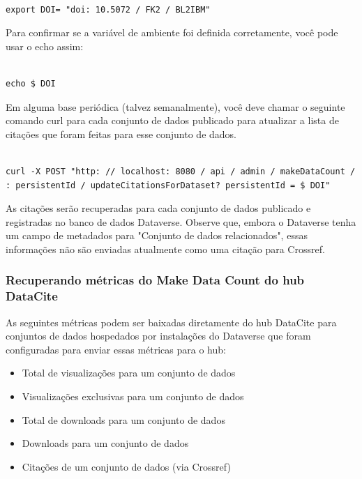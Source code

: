 \documentclass[12pt,hidelinks]{article}
\begin{document}
\begin{verbatim}

export DOI= "doi: 10.5072 / FK2 / BL2IBM"

\end{verbatim}

Para confirmar se a variável de ambiente foi definida corretamente, você pode usar o echo assim:

\begin{verbatim}

echo $ DOI

\end{verbatim}

Em alguma base periódica (talvez semanalmente), você deve chamar o seguinte comando curl para cada conjunto de dados publicado para atualizar a lista de citações que foram feitas para esse conjunto de dados.

\begin{verbatim}

curl -X POST "http: // localhost: 8080 / api / admin / makeDataCount /
: persistentId / updateCitationsForDataset? persistentId = $ DOI"

\end{verbatim}

As citações serão recuperadas para cada conjunto de dados publicado e registradas no banco de dados Dataverse. Observe que, embora o Dataverse tenha um campo de metadados para "Conjunto de dados relacionados", essas informações não são enviadas atualmente como uma citação para Crossref.

\subsubsection{Recuperando métricas do Make Data Count do hub DataCite}

\qquad As seguintes métricas podem ser baixadas diretamente do hub DataCite para conjuntos de dados hospedados por instalações do Dataverse que foram configuradas para enviar essas métricas para o hub:

\begin{itemize}

    \item Total de visualizações para um conjunto de dados
    \item Visualizações exclusivas para um conjunto de dados
    \item Total de downloads para um conjunto de dados
    \item Downloads para um conjunto de dados
    \item Citações de um conjunto de dados (via Crossref)

\end{itemize}
\end{document}
